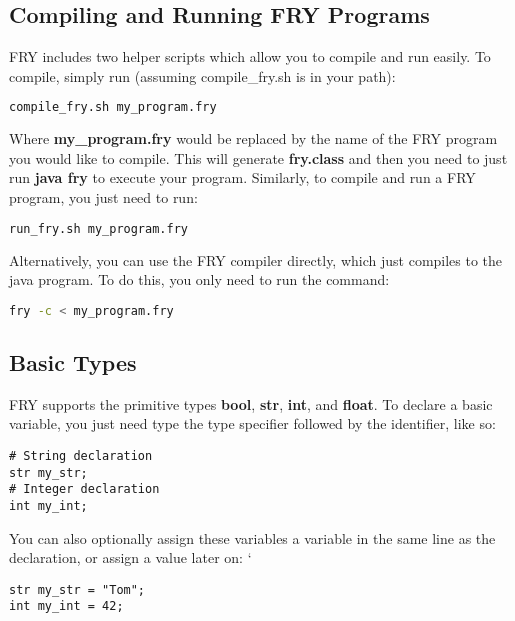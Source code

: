 \documentclass{article}
\begin{document}
\subsection{Compiling and Running FRY Programs}
FRY includes two helper scripts which allow you to compile and run easily. To compile, simply run (assuming compile\_fry.sh is in your path):
\begin{lstlisting}[language=bash,tabsize=1,basicstyle=\ttm,commentstyle=\color{comment}\ttm,otherkeywords={},
keywordstyle=\ttb\color{deepblue},
stringstyle=\color{deepgreen},
frame=tb,
showstringspaces=false,
breaklines=true]
compile_fry.sh my_program.fry
\end{lstlisting}
Where \textbf{my\_program.fry} would be replaced by the name of the FRY program you would like to compile. This will generate \textbf{fry.class} and then you need to just run \textbf{java fry} to execute your program. Similarly, to compile and run a FRY program, you just need to run:

\begin{lstlisting}[language=bash,tabsize=1,basicstyle=\ttm,commentstyle=\color{comment}\ttm,otherkeywords={},
keywordstyle=\ttb\color{deepblue},
stringstyle=\color{deepgreen},
frame=tb,
showstringspaces=false,
breaklines=true]
run_fry.sh my_program.fry
\end{lstlisting}
Alternatively, you can use the FRY compiler directly, which just compiles to the java program. To do this, you only need to run the command:
\begin{lstlisting}[language=bash,tabsize=1,basicstyle=\ttm,commentstyle=\color{comment}\ttm,otherkeywords={},
keywordstyle=\ttb\color{deepblue},
stringstyle=\color{deepgreen},
frame=tb,
showstringspaces=false,
breaklines=true]
fry -c < my_program.fry
\end{lstlisting}

\subsection{Basic Types}
FRY supports the primitive types \textbf{bool}, \textbf{str}, \textbf{int}, and \textbf{float}. To declare a basic variable, you just need type the type specifier followed by the identifier, like so:

\begin{lstlisting}
# String declaration
str my_str;
# Integer declaration 
int my_int;
\end{lstlisting}

You can also optionally assign these variables a variable in the same line as the declaration, or assign a value later on:
`
\begin{lstlisting}
str my_str = "Tom";
int my_int = 42;
\end{lstlisting}
\end{document}
